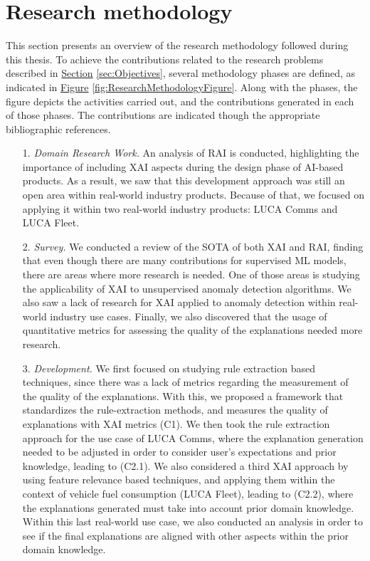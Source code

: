 \section{Research methodology}\label{sec:ResearchMethodology}
This section presents an overview of the research methodology followed during this thesis. To achieve the contributions related to the research problems described in \hyperref[sec:Objectives]{Section} \ref{sec:Objectives}, several methodology phases are defined, as indicated in \hyperref[fig:ResearchMethodologyFigure]{Figure} \ref{fig:ResearchMethodologyFigure}. Along with the phases, the figure depicts the activities carried out, and the contributions generated in each of those phases. The contributions are indicated though the appropriate bibliographic references.


\begin{itemize}

\item[1.] \textit{Domain Research Work.} An analysis of RAI is conducted, highlighting the importance of including XAI aspects during the design phase of AI-based products. As a result, we saw that this development approach was still an open area within real-world industry products. Because of that, we focused on applying it within two real-world industry products: LUCA Comms and LUCA Fleet.

\item[2.] \textit{Survey.} We conducted a review of the SOTA of both XAI and RAI, finding that even though there are many contributions for supervised ML models, there are areas where more research is needed. One of those areas is studying the applicability of XAI to unsupervised anomaly detection algorithms. We also saw a lack of research for XAI applied to anomaly detection within real-world industry use cases. Finally, we also discovered that the usage of quantitative metrics for assessing the quality of the explanations needed more research.

\item[3.] \textit{Development.} We first focused on studying rule extraction based techniques, since there was a lack of metrics regarding the measurement of the quality of the explanations. With this, we proposed a framework that standardizes the rule-extraction methods, and measures the quality of explanations with XAI metrics (C1). We then took the rule extraction approach for the use case of LUCA Comms, where the explanation generation needed to be adjusted in order to consider user's expectations and prior knowledge, leading to (C2.1). We also considered a third XAI approach by using feature relevance based techniques, and applying them within the context of vehicle fuel consumption (LUCA Fleet), leading to (C2.2), where the explanations generated must take into account prior domain knowledge. Within this last real-world use case, we also conducted an analysis in order to see if the final explanations are aligned with other aspects within the prior domain knowledge.


\end{itemize}
